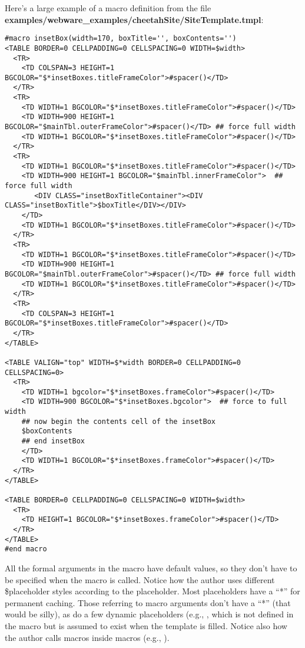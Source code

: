 Here's a large example of a macro definition from the file
{\bf examples/webware\_examples/cheetahSite/SiteTemplate.tmpl}:

\begin{verbatim}
#macro insetBox(width=170, boxTitle='', boxContents='')
<TABLE BORDER=0 CELLPADDING=0 CELLSPACING=0 WIDTH=$width>
  <TR>
    <TD COLSPAN=3 HEIGHT=1 BGCOLOR="$*insetBoxes.titleFrameColor">#spacer()</TD>
  </TR>
  <TR>
    <TD WIDTH=1 BGCOLOR="$*insetBoxes.titleFrameColor">#spacer()</TD>
    <TD WIDTH=900 HEIGHT=1 BGCOLOR="$mainTbl.outerFrameColor">#spacer()</TD> ## force full width 
    <TD WIDTH=1 BGCOLOR="$*insetBoxes.titleFrameColor">#spacer()</TD>
  </TR>
  <TR>
    <TD WIDTH=1 BGCOLOR="$*insetBoxes.titleFrameColor">#spacer()</TD>
    <TD WIDTH=900 HEIGHT=1 BGCOLOR="$mainTbl.innerFrameColor">  ## force full width 
       <DIV CLASS="insetBoxTitleContainer"><DIV CLASS="insetBoxTitle">$boxTitle</DIV></DIV>
    </TD>
    <TD WIDTH=1 BGCOLOR="$*insetBoxes.titleFrameColor">#spacer()</TD>
  </TR>
  <TR>
    <TD WIDTH=1 BGCOLOR="$*insetBoxes.titleFrameColor">#spacer()</TD>
    <TD WIDTH=900 HEIGHT=1 BGCOLOR="$mainTbl.outerFrameColor">#spacer()</TD> ## force full width 
    <TD WIDTH=1 BGCOLOR="$*insetBoxes.titleFrameColor">#spacer()</TD>
  </TR>
  <TR>
    <TD COLSPAN=3 HEIGHT=1 BGCOLOR="$*insetBoxes.titleFrameColor">#spacer()</TD>
  </TR>
</TABLE>
            
<TABLE VALIGN="top" WIDTH=$*width BORDER=0 CELLPADDING=0 CELLSPACING=0>
  <TR>
    <TD WIDTH=1 bgcolor="$*insetBoxes.frameColor">#spacer()</TD>
    <TD WIDTH=900 BGCOLOR="$*insetBoxes.bgcolor">  ## force to full width 
    ## now begin the contents cell of the insetBox
    $boxContents
    ## end insetBox     
    </TD>
    <TD WIDTH=1 BGCOLOR="$*insetBoxes.frameColor">#spacer()</TD>
  </TR>
</TABLE>

<TABLE BORDER=0 CELLPADDING=0 CELLSPACING=0 WIDTH=$width>
  <TR>
    <TD HEIGHT=1 BGCOLOR="$*insetBoxes.frameColor">#spacer()</TD>
  </TR>
</TABLE>
#end macro
\end{verbatim}

All the formal arguments in the  macro have default values, so
they don't have to be specified when the macro is called.  Notice how the author
uses different \$placeholder styles according to the placeholder.  Most
placeholders have a ``*'' for permanent caching.  Those referring to macro
arguments don't have a ``*'' (that would be silly), as do a few dynamic
placeholders (e.g., , which is not defined in
the macro but is assumed to exist when the template is filled.  Notice also how
the author calls macros inside macros (e.g., ).

